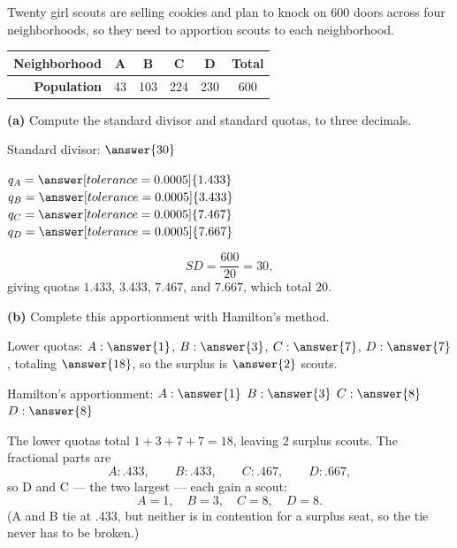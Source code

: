\documentclass[12pt]{ximera}
\begin{document}
\begin{problem}
Twenty girl scouts are selling cookies and plan to knock on $600$ doors across four
neighborhoods, so they need to apportion scouts to each neighborhood.

\begin{center}
\begin{tabular}{|r|c|c|c|c|c|}\hline
\textbf{Neighborhood} & A & B & C & D & \textbf{Total}\\\hline
\textbf{Population} & 43 & 103 & 224 & 230 & 600\\\hline
\end{tabular}
\end{center}

\begin{prompt}
\textbf{(a)} Compute the standard divisor and standard quotas, to three decimals.

Standard divisor: $\answer{30}$

\smallskip
$q_A = \answer[tolerance=0.0005]{1.433}$ \quad $q_B = \answer[tolerance=0.0005]{3.433}$
\quad $q_C = \answer[tolerance=0.0005]{7.467}$ \quad $q_D = \answer[tolerance=0.0005]{7.667}$

\begin{feedback}
\[ SD = \frac{600}{20} = 30, \]
giving quotas $1.433$, $3.433$, $7.467$, and $7.667$, which total $20$. \checkmark
\end{feedback}
\end{prompt}

\begin{prompt}
\textbf{(b)} Complete this apportionment with Hamilton's method.

Lower quotas: $A: \answer{1}$, $B: \answer{3}$, $C: \answer{7}$, $D: \answer{7}$,
totaling $\answer{18}$, so the surplus is $\answer{2}$ scouts.

\smallskip
Hamilton's apportionment: $A: \answer{1}$ \quad $B: \answer{3}$ \quad $C: \answer{8}$
\quad $D: \answer{8}$

\begin{feedback}
The lower quotas total $1+3+7+7 = 18$, leaving $2$ surplus scouts. The fractional parts
are
\[ A: .433, \qquad B: .433, \qquad C: .467, \qquad D: .667, \]
so D and C --- the two largest --- each gain a scout:
\[ A = 1, \quad B = 3, \quad C = 8, \quad D = 8. \]
(A and B tie at $.433$, but neither is in contention for a surplus seat, so the tie never
has to be broken.)
\end{feedback}
\end{prompt}


\end{problem}
\end{document}
